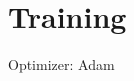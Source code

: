 \documentclass{article}
\theoremstyle{definition} \newtheorem{definition}{Definition}  \newtheorem{example}{Example}
\theoremstyle{remark} \newtheorem{remark}{Remark}
\newcounter{ct}
\begin{document}
%
%
%
%
%
%
%
%




\section{Training}
Optimizer: Adam \citep{kingma2014adam}

%
\end{document}
